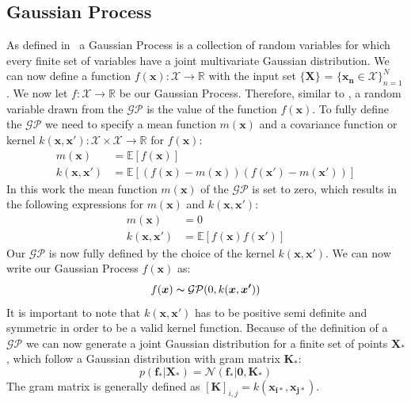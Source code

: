 \documentclass{article}
\begin{document}
\subsection{Gaussian Process} %
As defined in~\cite{RasmussenCarlEdward} a Gaussian Process is a collection of random variables for which every finite set of variables have a joint multivariate Gaussian distribution. We can now define a function $f(\bm{x}): \mathcal{X}\rightarrow \mathbb{R}$ with the input set $\{\bm{X}\}$ = $\{\bm{x_n} \in \mathcal{X} \}_{n=1}^N$. We now let $f: \mathcal{X}\rightarrow \mathbb{R}$ be our Gaussian Process. Therefore, similar to \cite{RasmussenCarlEdward}, a random variable drawn from the $\mathcal{GP}$ is the value of the function $f(\bm{x})$. To fully define the $\mathcal{GP}$ we need to specify a mean function $m(\bm{x})$ and a covariance function or kernel $k(\bm{x}, \bm{x'}): \mathcal{X} \times \mathcal{X} \rightarrow
    \mathbb{R}$ for $f(\bm{x})$:
\begin{equation}
    \begin{aligned}
        m(\bm{x})         & = \mathbb{E}[f(\bm{x})]                                    \\
        k(\bm{x},\bm{x'}) & = \mathbb{E}[(f(\bm{x})-m(\bm{x}))(f(\bm{x'})-m(\bm{x'}))]
    \end{aligned}
\end{equation}
In this work the mean function $m(\bm{x})$ of the $\mathcal{GP}$ is set to zero, which results in the following expressions for $m(\bm{x})$ and $ k(\bm{x},\bm{x'})$:
\begin{equation}
    \begin{aligned}
        m(\bm{x})         & = 0                               \\
        k(\bm{x},\bm{x'}) & = \mathbb{E}[f(\bm{x})f(\bm{x'})]
    \end{aligned}
\end{equation}
Our $\mathcal{GP}$ is now fully defined by the choice of the kernel $k(\bm{x},\bm{x'})$. We can now write our Gaussian Process $f(\bm{x})$ as:
\begin{equation}
    f(\bm{x})\thicksim \mathcal{G} \mathcal{P}(0,k(\bm{x},\bm{x'}))
\end{equation}
It is important to note that $ k(\bm{x},\bm{x'})$ has to be positive semi definite and symmetric in order to be a valid kernel function. Because of the definition of a $\mathcal{GP}$ we can now generate a joint Gaussian distribution for a finite set of points $\bm{X_*}$, which follow a Gaussian distribution with gram matrix $\bm{K_*}$:
\begin{equation}
    \label{eq:f_star_random_vector}
    p(\bm{f_*|\bm{X_*}}) = \mathcal{N}(\bm{f_*}|\bm{0},\bm{K_*})
\end{equation}
The gram matrix is generally defined as ${[\bm{K}]}_{i,j} = k(\bm{x_{i*}},\bm{x_{j*}})$.
\end{document}
